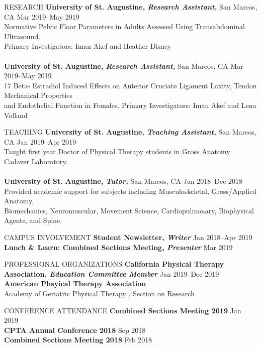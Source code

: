 \documentclass{resume} %
\begin{document}
\begin{rSection}{RESEARCH}
{\textbf{University of St. Augustine, \textit{Research Assistant,}} San Marcos, CA \hfill Mar 2019--May 2019 \\
Normative Pelvic Floor Parameters in Adults Assessed Using Transabdominal Ultrasound. \\Primary Investigators: Iman Akef and Heather Disney}
\\\\
{\textbf{University of St. Augustine, \textit{Research Assistant,}} San Marcos, CA \hfill Mar 2019--May 2019 \\
17 Beta- Estradiol Induced Effects on Anterior Cruciate Ligament Laxity, Tendon Mechanical Properties \\and Endothelial Function in Females. Primary Investigators: Iman Akef and Lena Volland}
\end{rSection} 
\begin{rSection}{TEACHING}
{\textbf{University of St. Augustine, \textit{Teaching Assistant,}} San Marcos, CA \hfill Jan 2019--Apr 2019 \\
Taught first year Doctor of Physical Therapy students in Gross Anatomy Cadaver Laboratory.}
\\\\
{\textbf{University of St. Augustine, \textit{Tutor,}} San Marcos, CA \hfill Jan 2018--Dec 2018 \\
Provided academic support for subjects including Musculoskeletal, Gross/Applied Anatomy, \\Biomechanics, Neuromuscular, Movement Science, Cardiopulmonary, Biophysical Agents, and Spine.}
\end{rSection} 

\begin{rSection}{CAMPUS INVOLVEMENT}
{\textbf{Student Newsletter, \textit{Writer}} \hfill{Jan 2018--Apr 2019}}
\\
{\textbf{Lunch \& Learn: Combined Sections Meeting, \textit{Presenter}} \hfill{Mar 2019}}
\end{rSection} 
\begin{rSection}{PROFESSIONAL ORGANIZATIONS}
{\textbf{California Physical Therapy Association, \textit{Education Committee Member}} \hfill{Jan 2019--Dec 2019}}
\\
{\textbf{American Phsyical Therapy Association}
\\Academy of Geriatric Physical Therapy , Section on Research}
\end{rSection} 
\begin{rSection}{CONFERENCE ATTENDANCE}
{\textbf{Combined Sections Meeting 2019} \hfill{Jan 2019}}
\\
{\textbf{CPTA Annual Conference 2018} \hfill{Sep 2018}}\\
{\textbf{Combined Sections Meeting 2018} \hfill{Feb 2018}}
\end{rSection}
\end{document}
